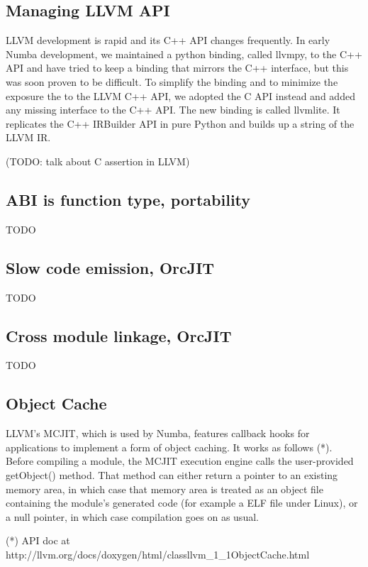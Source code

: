 \documentclass{acm_proc_article-sp}
\begin{document}
\subsection{Managing LLVM API}

LLVM development is rapid and its C++ API changes frequently.
In early Numba development, we maintained a python binding, called llvmpy,
to the C++ API and have tried to keep a binding that mirrors the C++ interface,
but this was soon proven to be difficult.
To simplify the binding and to minimize the exposure the to the LLVM C++ API,
we adopted the C API instead and added any missing interface to the C++ API.
The new binding is called llvmlite.  It replicates the C++ IRBuilder API in
pure Python and builds up a string of the LLVM IR.

(TODO: talk about C assertion in LLVM)

\subsection{ABI is function type, portability}

TODO

\subsection{Slow code emission, OrcJIT}

TODO

\subsection{Cross module linkage, OrcJIT}

TODO

\subsection{Object Cache}

LLVM's MCJIT, which is used by Numba, features callback hooks for
applications to implement a form of object caching.  It works
as follows (*).  Before compiling a module, the MCJIT execution engine
calls the user-provided getObject() method.  That method can either
return a pointer to an existing memory area, in which case that
memory area is treated as an object file containing the module's
generated code (for example a ELF file under Linux), or a null pointer,
in which case compilation goes on as usual.

(*) API doc at http://llvm.org/docs/doxygen/html/classllvm_1_1ObjectCache.html
\end{document}
